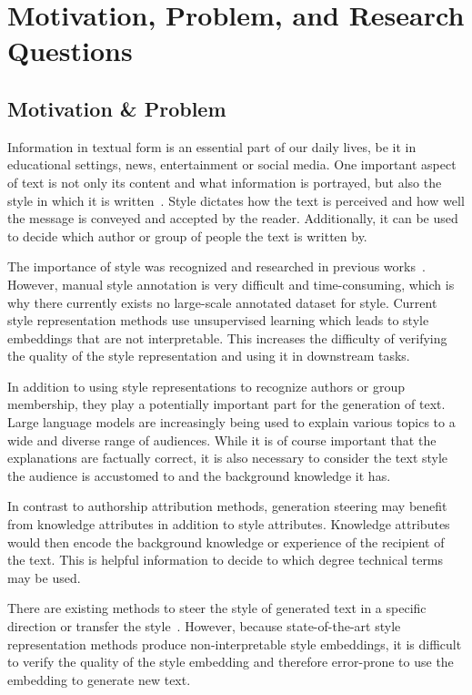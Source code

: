 
\section{Motivation, Problem, and Research Questions}

\subsection{Motivation \& Problem}
Information in textual form is an essential part of our daily lives, be it in educational settings, news, entertainment or social media. One important aspect of text is not only its content and what information is portrayed, but also the style in which it is written~\cite{wegmannSameAuthorJust2022}. Style dictates how the text is perceived and how well the message is conveyed and accepted by the reader. Additionally, it can be used to decide which author or group of people the text is written by.

The importance of style was recognized and researched in previous works~\cite{zhu-etal-2024-styleflow, ijcai2020p526,wegmannSameAuthorJust2022}. However, manual style annotation is very difficult and time-consuming, which is why there currently exists no large-scale annotated dataset for style. Current style representation methods use unsupervised learning which leads to style embeddings that are not interpretable. This increases the difficulty of verifying the quality of the style representation and using it in downstream tasks.

In addition to using style representations to recognize authors or group membership, they play a potentially important part for the generation of text. Large language models are increasingly being used to explain various topics to a wide and diverse range of audiences. While it is of course important that the explanations are factually correct, it is also necessary to consider the text style the audience is accustomed to and the background knowledge it has.

In contrast to authorship attribution methods, generation steering may benefit from knowledge attributes in addition to style attributes. Knowledge attributes would then encode the background knowledge or experience of the recipient of the text. This is helpful information to decide to which degree technical terms may be used.

There are existing methods to steer the style of generated text in a specific direction or transfer the style~\cite{zhu-etal-2024-styleflow, ijcai2020p526}.
However, because state-of-the-art style representation methods produce non-interpretable style embeddings, it is difficult to verify the quality of the style embedding and therefore error-prone to use the embedding to generate new text.


